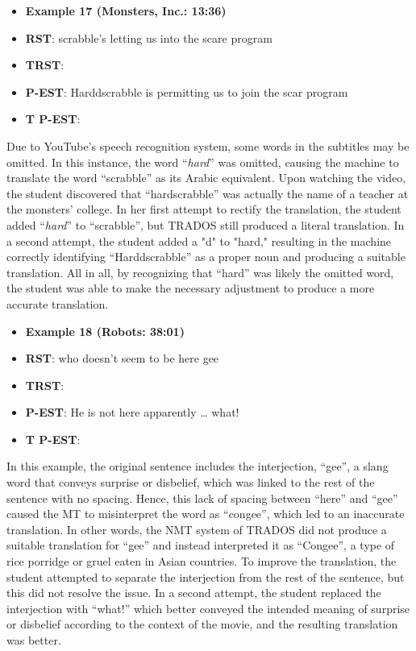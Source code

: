 \documentclass[english]{textolivre}
\begin{document}
\begin{itemize}
\item \textbf{Example 17 (Monsters, Inc.: 13:36)}
\item \textbf{RST}: scrabble’s letting us into the scare program
\item \textbf{TRST}: 
\item \textbf{P-EST}: Harddscrabble is permitting us to join the scar program
\item \textbf{T P-EST}: 
\end{itemize}

Due to YouTube's speech recognition system, some words in the subtitles may be omitted. In this instance, the word “\emph{hard}” was omitted, causing the machine to translate the word “scrabble” as its Arabic equivalent. Upon watching the video, the student discovered that “hardscrabble” was actually the name of a teacher at the monsters’ college. In her first attempt to rectify the translation, the student added “\emph{hard}” to “scrabble”, but TRADOS still produced a literal translation. In a second attempt, the student added a "d" to "hard," resulting in the machine correctly identifying “Harddscrabble” as a proper noun and producing a suitable translation. All in all, by recognizing that “hard” was likely the omitted word, the student was able to make the necessary adjustment to produce a more accurate translation.

\begin{itemize}
\item \textbf{Example 18 (Robots: 38:01)} 
\item \textbf{RST}: who doesn’t seem to be here gee
\item \textbf{TRST}: 
\item \textbf{P-EST}: He is not here apparently … what!
\item \textbf{T P-EST}:
\end{itemize}

In this example, the original sentence includes the interjection, “gee”, a slang word that conveys surprise or disbelief, which was linked to the rest of the sentence with no spacing. Hence, this lack of spacing between “here” and “gee” caused the MT to misinterpret the word as “congee”, which led to an inaccurate translation. In other words, the NMT system of TRADOS did not produce a suitable translation for “gee” and instead interpreted it as “Congee”, a type of rice porridge or gruel eaten in Asian countries. To improve the translation, the student attempted to separate the interjection from the rest of the sentence, but this did not resolve the issue. In a second attempt, the student replaced the interjection with “what!” which better conveyed the intended meaning of surprise or disbelief according to the context of the movie, and the resulting translation was better.
\end{document}
